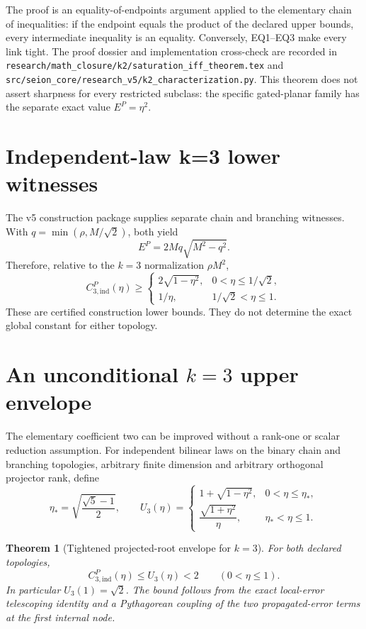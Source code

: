\documentclass[11pt]{amsart}
\newtheorem{theorem}{Theorem}[section]
\theoremstyle{definition}
\theoremstyle{remark}
\begin{document}
The proof is an equality-of-endpoints argument applied to the elementary
chain of inequalities: if the endpoint equals the product of the declared
upper bounds, every intermediate inequality is an equality. Conversely,
EQ1--EQ3 make every link tight. The proof dossier and implementation
cross-check are recorded in
\texttt{research/math\_closure/k2/saturation\_iff\_theorem.tex} and
\texttt{src/seion\_core/research\_v5/k2\_characterization.py}. This theorem
does not assert sharpness for every restricted subclass: the specific
gated-planar family has the separate exact value $E^P=\eta^2$.

\section{Independent-law k=3 lower witnesses}

The v5 construction package supplies separate chain and branching witnesses.
With $q=\min(\rho,M/\sqrt2)$, both yield
\[
 E^P=2Mq\sqrt{M^2-q^2}.
\]
Therefore, relative to the $k=3$ normalization $\rho M^2$,
\[
 C_{3,\mathrm{ind}}^P(\eta)\ge
 \begin{cases}
 2\sqrt{1-\eta^2}, & 0<\eta\le1/\sqrt2,\\
 1/\eta, & 1/\sqrt2<\eta\le1.
 \end{cases}
\]
These are certified construction lower bounds. They do not determine the exact
global constant for either topology.

\section{An unconditional $k=3$ upper envelope}

The elementary coefficient two can be improved without a rank-one or scalar
reduction assumption. For independent bilinear laws on the binary chain and
branching topologies, arbitrary finite dimension and arbitrary orthogonal
projector rank, define
\[
 \eta_* = \sqrt{\frac{\sqrt5-1}{2}},\qquad
 U_3(\eta)=
 \begin{cases}
  1+\sqrt{1-\eta^2}, & 0<\eta\le\eta_*,\\[1mm]
  \dfrac{\sqrt{1+\eta^2}}{\eta}, & \eta_*<\eta\le1.
 \end{cases}
\]

\begin{theorem}[Tightened projected-root envelope for $k=3$]
\label{thm:k3envelope}
For both declared topologies,
\[
 C_{3,\mathrm{ind}}^P(\eta)\le U_3(\eta)<2
 \qquad (0<\eta\le1).
\]
In particular $U_3(1)=\sqrt2$. The bound follows from the exact local-error
telescoping identity and a Pythagorean coupling of the two propagated-error
terms at the first internal node.
\end{theorem}
\end{document}
